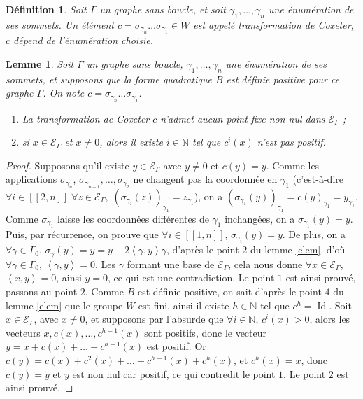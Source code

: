 \documentclass[a4paper,11pt]{article}
\newtheorem{lm}[thm]{Lemme}%
\newtheorem{defi}[thm]{Définition}%
\DeclareMathOperator{\Id}{Id}
\newcommand{\ps}[2]{\left\langle#1,#2\right\rangle}
\newcommand{\EG}{\mathscr{E}_\Gamma}
\newcommand{\ent}[2]{[\![#1,#2]\!]}
\begin{document}
\begin{defi}
	Soit $\Gamma$ un graphe sans boucle, et soit $\gamma_1,\dots,\gamma_n$ une énumération de ses sommets. Un élément $c=\sigma_{\gamma_n}\dots\sigma_{\gamma_1}\in W$ est appelé \emph{transformation de Coxeter}, $c$ dépend de l'énumération choisie.
\end{defi}
\begin{lm}
\label{lm_positif}
Soit $\Gamma$ un graphe sans boucle, $\gamma_1,\dots,\gamma_n$ une énumération de ses sommets, et supposons que la forme quadratique $B$ est définie positive pour ce graphe $\Gamma$. On note $c=\sigma_{\gamma_n}\dots\sigma_{\gamma_1}$.
\begin{enumerate}
	\item La transformation de Coxeter $c$ n'admet aucun point fixe non nul dans $\EG$ ;
	\item si $x\in\EG$ et $x\neq0$, alors il existe $i\in\mathbb N$ tel que $c^i(x)$ n'est pas positif.
\end{enumerate}
\end{lm}
\begin{proof}
	Supposons qu'il existe $y\in\EG$ avec $y\neq0$ et $c(y)=y$. Comme les applications $\sigma_{\gamma_n}$, $\sigma_{\gamma_{n-1}},\dots,\sigma_{\gamma_2}$ ne changent pas la coordonnée en $\gamma_1$ (c'est-à-dire $\forall i\in\ent{2}{n}\;\forall z\in\EG,\;(\sigma_{\gamma_i}(z))_{\gamma_1}=z_{\gamma_1}$), on a $(\sigma_{\gamma_1}(y))_{\gamma_1}=c(y)_{\gamma_1}=y_{\gamma_1}$. Comme $\sigma_{\gamma_1}$ laisse les coordonnées différentes de $\gamma_1$ inchangées, on a $\sigma_{\gamma_1}(y)=y$. Puis, par récurrence, on prouve que $\forall i\in\ent{1}{n}$, $\sigma_{\gamma_i}(y)=y$. De plus, on a $\forall\gamma\in\Gamma_0$, $\sigma_{\gamma}(y)=y=y-2\ps{\bar\gamma}{y}\bar\gamma$, d'après le point $2$ du lemme \ref{elem}, d'où $\forall\gamma\in\Gamma_0$, $\ps{\bar\gamma}{y}=0$. Les $\bar\gamma$ formant une base de $\EG$, cela nous donne $\forall x\in\EG$, $\ps{x}{y}=0$, ainsi $y=0$, ce qui est une contradiction. Le point $1$ est ainsi prouvé, passons au point $2$. Comme $B$ est définie positive, on sait d'après le point $4$ du lemme \ref{elem} que le groupe $W$ est fini, ainsi il existe $h\in\mathbb N$ tel que $c^h=\Id$. Soit $x\in\EG$, avec $x\neq0$, et supposons par l'absurde que $\forall i\in\mathbb N$, $c^i(x)>0$, alors les vecteurs $x,c(x),\dots,c^{h-1}(x)$ sont positifs, donc le vecteur $y=x+c(x)+\dots+c^{h-1}(x)$ est positif. Or $c(y)=c(x)+c^2(x)+\dots+c^{h-1}(x)+c^h(x)$, et $c^h(x)=x$, donc $c(y)=y$ et $y$ est non nul car positif, ce qui contredit le point $1$. Le point $2$ est ainsi prouvé.
\end{proof}
\clearpage
\end{document}
